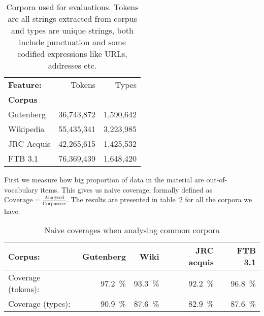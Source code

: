 \documentclass[a4paper,12pt]{article}
\begin{document}
\begin{table}
    \begin{scriptsize}
  \centering
    \begin{tabular}{|l|r|r|}
        \hline
        \bf Feature: & Tokens     & Types     \\
        \bf Corpus   &            &           \\
        \hline
        Gutenberg    & 36,743,872 & 1,590,642 \\
        Wikipedia    & 55,435,341 & 3,223,985 \\
        JRC Acquis   & 42,265,615 & 1,425,532 \\
        FTB 3.1      & 76,369,439 & 1,648,420 \\
        \hline
    \end{tabular}
  \caption{Corpora used for evaluations. Tokens are all strings extracted from
      corpus and types are unique strings, both include punctuation and some
      codified expressions like URLs, addresses etc.
  \label{table:corpora}}
  \end{scriptsize}
\end{table}

First we measure how big proportion of data in the material are
out-of-vocabulary items. This gives us naive coverage, formally defined as
$\mathrm{Coverage} = \frac{\mathrm{Analysed}}{\mathrm{Corpus size}}$.
The results are presented in table~\ref{table:coverage} for all the
corpora we have.

\begin{table}
    \begin{scriptsize}
    \centering
    \begin{tabular}{|l|r|r|r|r|}
        \hline
        Corpus:            & \bf Gutenberg & \bf Wiki & \bf JRC acquis & \bf FTB 3.1 \\
        \hline
        Coverage (tokens): & 97.2~\%       & 93.3~\%  & 92.2~\%        & 96.8~\% \\
        Coverage (types):  & 90.9~\%       & 87.6~\%  & 82.9~\%        & 87.6~\% \\
        \hline
    \end{tabular}
    \caption{Naive coverages when analysing common corpora
    \label{table:coverage}}
  \end{scriptsize}
\end{table}

\end{document}
